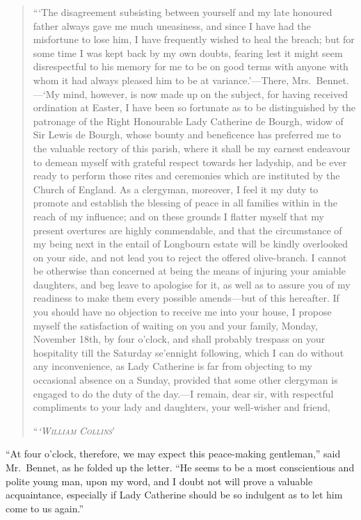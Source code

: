 \documentclass[12pt,english]{book}
\newcommand{\noun}[1]{\textsc{#1}}
\begin{document}
\begin{quotation}
{}```The disagreement subsisting between yourself and my late honoured
father always gave me much uneasiness, and since I have had the misfortune
to lose him, I have frequently wished to heal the breach; but for
some time I was kept back by my own doubts, fearing lest it might
seem disrespectful to his memory for me to be on good terms with anyone
with whom it had always pleased him to be at variance.'\mbox{---}There,
Mrs.\ Bennet.\mbox{---}`My mind, however, is now made up on the
subject, for having received ordination at Easter, I have been so
fortunate as to be distinguished by the patronage of the Right Honourable
Lady Catherine de Bourgh, widow of Sir Lewis de Bourgh, whose bounty
and beneficence has preferred me to the valuable rectory of this parish,
where it shall be my earnest endeavour to demean myself with grateful
respect towards her ladyship, and be ever ready to perform those rites
and ceremonies which are instituted by the Church of England. As a
clergyman, moreover, I feel it my duty to promote and establish the
blessing of peace in all families within in the reach of my influence;
and on these grounds I flatter myself that my present overtures are
highly commendable, and that the circumstance of my being next in
the entail of Longbourn estate will be kindly overlooked on your side,
and not lead you to reject the offered olive-branch. I cannot be otherwise
than concerned at being the means of injuring your amiable daughters,
and beg leave to apologise for it, as well as to assure you of my
readiness to make them every possible amends\mbox{---}but of this
hereafter. If you should have no objection to receive me into your
house, I propose myself the satisfaction of waiting on you and your
family, Monday, November 18th, by four o'clock, and shall probably
trespass on your hospitality till the Saturday se'ennight following,
which I can do without any inconvenience, as Lady Catherine is far
from objecting to my occasional absence on a Sunday, provided that
some other clergyman is engaged to do the duty of the day.\mbox{---}I
remain, dear sir, with respectful compliments to your lady and daughters,
your well-wisher and friend,

``\textit{\emph{\noun{`William}}} \textit{\emph{\noun{Collins}}}'
\end{quotation}
{}``At four o'clock, therefore, we may expect this peace-making gentleman,''
said Mr.\ Bennet, as he folded up the letter. {}``He seems to be
a most conscientious and polite young man, upon my word, and I doubt
not will prove a valuable acquaintance, especially if Lady Catherine
should be so indulgent as to let him come to us again.''
\end{document}
